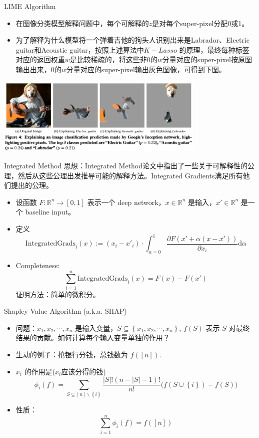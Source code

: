 \begin{frame}{LIME Algorithm}
\begin{itemize}
    \item 在图像分类模型解释问题中，每个可解释的$z$是对每个super-pixel分配0或1。
    \item 为了解释为什么模型将一个弹着吉他的狗头人识别出来是Labrador、Electric guitar和Acoustic guitar，按照上述算法中$K-Lasso$ 的原理，最终每种标签对应的返回权重$w$是比较稀疏的，将这些非$0$的$w$分量对应的super-pixel按原图输出出来，$0$的$w$分量对应的super-pixel输出灰色图像，可得到下图。
\end{itemize}
\begin{center}
    \includegraphics[width=0.75\textwidth]{assets/limee.png}
\end{center}
\end{frame}

\begin{frame}{Integrated Method}
    思想：Integrated Method论文中指出了一些关于可解释性的公理，然后从这些公理出发推导可能的解释方法。Integrated Gradients满足所有他们提出的公理。

    \begin{itemize}
        \item 设函数 $F: \mathbb{R}^{n} \to [0, 1]$ 表示一个 deep network，$x\in \mathbb{R}^{n}$ 是输入，$x'\in \mathbb{R}^{n}$ 是一个 baseline input。
        \item 定义 
        \[
        \text{IntegratedGrads}_i(x) := (x_i - x'_i) \cdot \int_{\alpha=0}^{1} \frac{\partial F(x' + \alpha(x - x'))}{\partial x_i}  \mathrm{d}\alpha  
        \]
        \item Completeness: 
        \[
        \sum_{i=1}^{n}\text{IntegratedGrads}_i(x) = F(x) - F(x')
        \]
        证明方法：简单的微积分。
    \end{itemize}
\end{frame}

\begin{frame}{Shapley Value Algorithm (a.k.a. SHAP)}
    \begin{itemize}
        \item 问题：$x_1, x_2, \cdots, x_n$ 是输入变量，$S \subseteq \left\{ x_1, x_2, \cdots, x_n \right\} $, $f(S)$ 表示 $S$ 对最终结果的贡献。如何计算每个输入变量单独的作用？
        \item 生动的例子：抢银行分钱，总钱数为 $f([n])$.
        \item $x_i$ 的作用是($x_i$应该分得的钱)
    \[
        \phi_i(f) = \sum_{S \subseteq [n]\backslash \left\{ i \right\}} \frac{\left| S \right| ! \left( n - |S| - 1 \right) !}{n!} \Big( f(S \cup \left\{ i \right\}) - f(S) \Big)
    \]
    \item 性质：
    \[
        \sum_{i=1}^{n} \phi_i(f) = f([n])  
    \]
    \end{itemize}
\end{frame}
